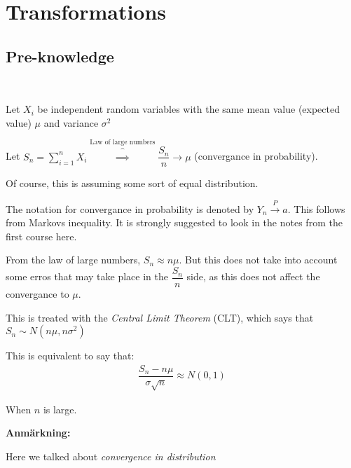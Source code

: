\section{Transformations}\par
\subsection{Pre-knowledge}\hfill\\
\par\bigskip
\noindent Let $X_i$ be independent random variables with the same mean value (expected value) $\mu$ and variance $\sigma^2$ \par
Let $S_n = \sum_{i=1}^{n}X_i\overbrace{\implies}^{\text{Law of large numbers}}\dfrac{S_n}{n}\to\mu$ (convergance in probability).\par
\noindent Of course, this is assuming some sort of equal distribution. 
\par\bigskip
The notation for convergance in probability is denoted by $Y_n\stackrel{P}{\to}a$. This follows from Markovs inequality. It is strongly suggested to look in the notes from the first course here. 
\par\bigskip
From the law of large numbers, $S_n\approx n\mu$. But this does not take into account some erros that may take place in the $\dfrac{S_n}{n}$ side, as this does not affect the convergance to $\mu$.\par
This is treated with the \textit{Central Limit Theorem}  (CLT), which says that $S_n\sim N(n\mu,n\sigma^2)$ 
\par\bigskip
\noindent This is equivalent to say that:
\begin{equation*}
  \begin{gathered}
    \dfrac{S_n-n\mu}{\sigma\sqrt{n}}\approx N(0,1)
  \end{gathered}
\end{equation*}

When $n$ is large.
\par\bigskip
\noindent\textbf{Anmärkning:}\par
\noindent Here we talked about \textit{convergence in distribution} 
\par\bigskip

